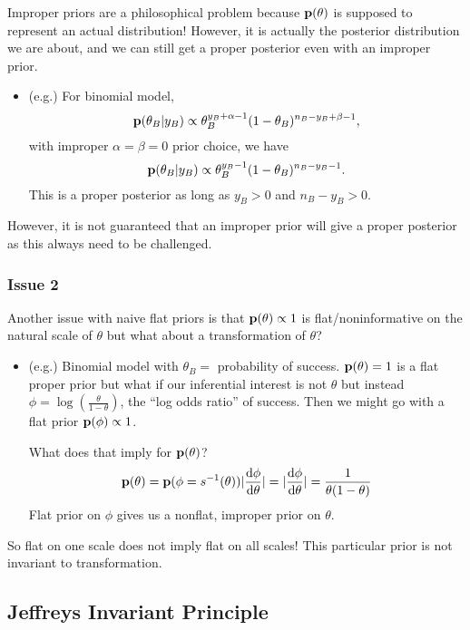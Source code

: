 Improper priors are a philosophical problem because ${\mathbf p}(\theta)$ is supposed to represent an actual distribution! However, it is actually the posterior distribution we are about, and we can still get a proper posterior even with an improper prior.
\begin{itemize}
    \item (e.g.) For binomial model,
    \[
        {\mathbf p}(\theta_B| y_B) \propto \theta_B^{y_B+\alpha-1}(1-\theta_B)^{n_B - y_B + \beta - 1},
    \]
    with improper $\alpha=\beta=0$ prior choice, we have
    \[ 
        {\mathbf p}(\theta_B|y_B) \propto \theta_B^{y_B-1} (1-\theta_B)^{n_B - y_B -1}.
    \]
    This is a proper posterior as long as $y_B > 0$ and $n_B - y_B > 0$.
\end{itemize}

However, it is not guaranteed that an improper prior will give a proper posterior as this always need to be challenged.

\subsubsection*{Issue 2}

Another issue with naive flat priors is that ${\mathbf p}(\theta) \propto 1$ is flat/noninformative on the natural scale of $\theta$ but what about a transformation of $\theta$?

\begin{itemize}
    \item (e.g.) Binomial model with $\theta_B = $ probability of success. ${\mathbf p}(\theta) = 1$  is a flat proper prior but what if our inferential interest is not $\theta$ but instead $\phi = \log(\frac{\theta}{1-\theta})$, the ``log odds ratio'' of success. Then we might go with a flat prior ${\mathbf p}(\phi) \propto 1$. 
    
    What does that imply for ${\mathbf p}(\theta)$?
    \[
     {\mathbf p}(\theta) = {\mathbf p}(\phi = s^{-1}(\theta))|\frac{\mathop{}\!\mathrm{d} \phi}{\mathop{}\!\mathrm{d} \theta}| = |\frac{\mathop{}\!\mathrm{d} \phi}{\mathop{}\!\mathrm{d} \theta}| = \frac{1}{\theta(1 - \theta)}
     \]
     Flat prior on $\phi$ gives us a nonflat, improper prior on $\theta$.
\end{itemize}

So flat on one scale does not imply flat on all scales! This particular prior is not invariant to transformation.

\subsection{Jeffreys Invariant Principle}

